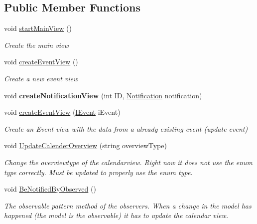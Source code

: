 \subsection*{Public Member Functions}
\begin{DoxyCompactItemize}
\item 
void \hyperlink{class_calendar_system_1_1_controller_1_1_view_controller_a70e4c5e8dd89b0dbd3f8da0d39ab652b}{start\+Main\+View} ()
\begin{DoxyCompactList}\small\item\em Create the main view \end{DoxyCompactList}\item 
void \hyperlink{class_calendar_system_1_1_controller_1_1_view_controller_a6f51cc970fd23a5cfa9c861af874be9e}{create\+Event\+View} ()
\begin{DoxyCompactList}\small\item\em Create a new event view \end{DoxyCompactList}\item 
\hypertarget{class_calendar_system_1_1_controller_1_1_view_controller_a5ccc036864876db5c50e549ba2ab8093}{void {\bfseries create\+Notification\+View} (int I\+D, \hyperlink{class_calendar_system_1_1_model_1_1_notification}{Notification} notification)}\label{class_calendar_system_1_1_controller_1_1_view_controller_a5ccc036864876db5c50e549ba2ab8093}

\item 
void \hyperlink{class_calendar_system_1_1_controller_1_1_view_controller_a536858a1ed8b64b91a0b06d42c62875a}{create\+Event\+View} (\hyperlink{interface_calendar_system_1_1_model_1_1_i_event}{I\+Event} i\+Event)
\begin{DoxyCompactList}\small\item\em Create an Event view with the data from a already existing event (update event) \end{DoxyCompactList}\item 
void \hyperlink{class_calendar_system_1_1_controller_1_1_view_controller_a595641816a2e31edac5fe38f4d1f9f17}{Update\+Calender\+Overview} (string overview\+Type)
\begin{DoxyCompactList}\small\item\em Change the overviewtype of the calendarview. Right now it does not use the enum type correctly. Must be updated to properly use the enum type. \end{DoxyCompactList}\item 
void \hyperlink{class_calendar_system_1_1_controller_1_1_view_controller_a46f9d0983af0da3f95e00e4047d685a5}{Be\+Notified\+By\+Observed} ()
\begin{DoxyCompactList}\small\item\em The observable pattern method of the observers. When a change in the model has happened (the model is the observable) it has to update the calendar view. \end{DoxyCompactList}\end{DoxyCompactItemize}
